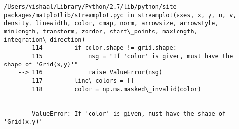 \documentclass[11pt]{article}
\begin{document}
\begin{Verbatim}[commandchars=\\\{\}]
        /Users/vishaal/Library/Python/2.7/lib/python/site-packages/matplotlib/streamplot.pyc in streamplot(axes, x, y, u, v, density, linewidth, color, cmap, norm, arrowsize, arrowstyle, minlength, transform, zorder, start\_points, maxlength, integration\_direction)
        114         if color.shape != grid.shape:
        115             msg = "If 'color' is given, must have the shape of 'Grid(x,y)'"
    --> 116             raise ValueError(msg)
        117         line\_colors = []
        118         color = np.ma.masked\_invalid(color)


        ValueError: If 'color' is given, must have the shape of 'Grid(x,y)'

    \end{Verbatim}

    \begin{center}
    \end{center}
    { \hspace*{\fill} \\}
    

    
    
    
    
\end{document}
